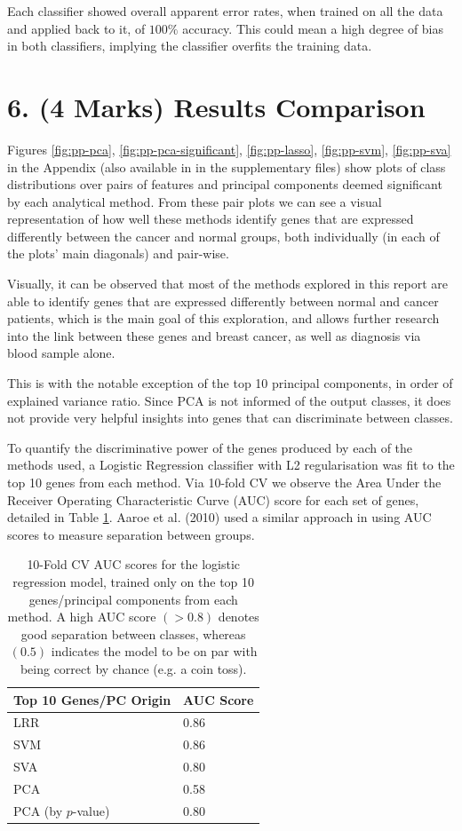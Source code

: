 \documentclass[twocolumn]{article}
\begin{document}
Each classifier showed overall apparent error rates, when trained on all the data and applied back to it, of $100\%$ accuracy. This could mean a high degree of bias in both classifiers, implying the classifier overfits the training data.

\section{6. (4 Marks) Results Comparison}

Figures \ref{fig:pp-pca}, \ref{fig:pp-pca-significant}, \ref{fig:pp-lasso}, \ref{fig:pp-svm}, \ref{fig:pp-sva} in the Appendix (also available in  in the supplementary files) show plots of class distributions over pairs of features and principal components deemed significant by each analytical method. From these pair plots we can see a visual representation of how well these methods identify genes that are expressed differently between the cancer and normal groups, both individually (in each of the plots' main diagonals) and pair-wise.

Visually, it can be observed that most of the methods explored in this report are able to identify genes that are expressed differently between normal and cancer patients, which is the main goal of this exploration, and allows further research into the link between these genes and breast cancer, as well as diagnosis via blood sample alone. 

This is with the notable exception of the top 10 principal components, in order of explained variance ratio. Since PCA is not informed of the output classes, it does not provide very helpful insights into genes that can discriminate between classes.

To quantify the discriminative power of the genes produced by each of the methods used, a Logistic Regression classifier with L2 regularisation was fit to the top 10 genes from each method. Via 10-fold CV we observe the Area Under the Receiver Operating Characteristic Curve (AUC) score for each set of genes, detailed in Table \ref{tab:auc-scores}. Aaroe et al. (2010) \cite{Aarøe2010} used a similar approach in using AUC scores to measure separation between groups.

\begin{table}[H]
    \centering
    \begin{tabular}{ll}
    \toprule
    Top 10 Genes/PC Origin & AUC Score\\
    \midrule
    LRR & 0.86\\
    SVM & 0.86\\
    SVA & 0.80\\
    PCA & 0.58\\
    PCA (by $p$-value) & 0.80\\
    \bottomrule
    \end{tabular}
    \caption{10-Fold CV AUC scores for the logistic regression model, trained only on the top 10 genes/principal components from each method. A high AUC score $(>0.8)$ denotes good separation between classes, whereas $(0.5)$ indicates the model to be on par with being correct by chance (e.g. a coin toss).}
    \label{tab:auc-scores}
\end{table}
\end{document}
